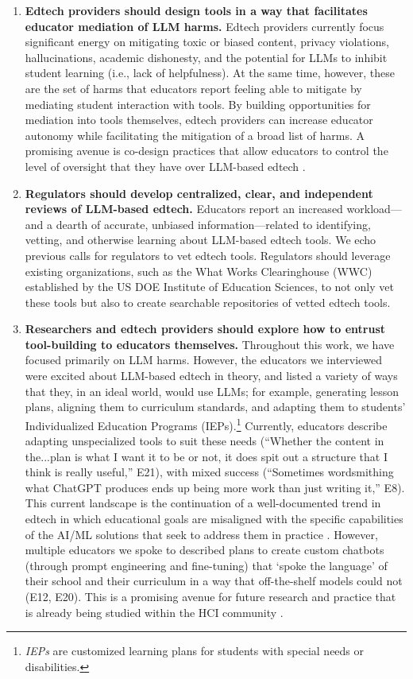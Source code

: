 \begin{enumerate}
    \item \textbf{Edtech providers should design tools in a way that facilitates educator mediation of LLM harms.} Edtech providers currently focus significant energy on mitigating toxic or biased content, privacy violations, hallucinations, academic dishonesty, and the potential for LLMs to inhibit student learning (i.e., lack of helpfulness). At the same time, however, these are the set of harms that educators report feeling able to mitigate by mediating student interaction with tools. By building opportunities for mediation into tools themselves, edtech providers can increase educator autonomy while facilitating the mitigation of a broad list of harms. A promising avenue is co-design practices that allow educators to control the level of oversight that they have over LLM-based edtech \cite[e.g.,][]{de_laet_surveying_2021}.
    \item  \textbf{Regulators should develop centralized, clear, and independent reviews of LLM-based edtech.} Educators report an increased workload---and a dearth of accurate, unbiased information---related to identifying, vetting, and otherwise learning about LLM-based edtech tools. We echo previous calls \citep[e.g.,][]{williamson_time_2024} for regulators to vet edtech tools. Regulators should leverage existing organizations, such as the What Works Clearinghouse (WWC) established by the US DOE Institute of Education Sciences, to not only vet these tools but also to create searchable repositories of vetted edtech tools.
    \item \textbf{Researchers and edtech providers should explore how to entrust tool-building to educators themselves.} Throughout this work, we have focused primarily on LLM harms. However, the educators we interviewed were excited about LLM-based edtech in theory, and listed a variety of ways that they, in an ideal world, would use LLMs; for example, generating lesson plans, aligning them to curriculum standards, and adapting them to students' Individualized Education Programs (IEPs).\footnote{\textit{IEPs} are customized learning plans for students with special needs or disabilities.} Currently, educators describe adapting unspecialized tools to suit these needs (``Whether the content in the...plan is what I want it to be or not, it does spit out a structure that I think is really useful,'' E21), with mixed success (``Sometimes wordsmithing what ChatGPT produces ends up being more work than just writing it,'' E8). This current landscape is the continuation of a well-documented trend in edtech in which educational goals are misaligned with the specific capabilities of the AI/ML solutions that seek to address them in practice \cite{liu_reimagining_2023}. However, multiple educators we spoke to described plans to create custom chatbots (through prompt engineering and fine-tuning) that `spoke the language' of their school and their curriculum in a way that off-the-shelf models could not (E12, E20). This is a promising avenue for future research and practice that is already being studied within the HCI community \citep[e.g.,][]{hedderich_piece_2024, f63ccd0b-5bc1-31b0-aa9a-fbd5ab3ba3cc, https://doi.org/10.1111/bjet.12861}.

\end{enumerate}
